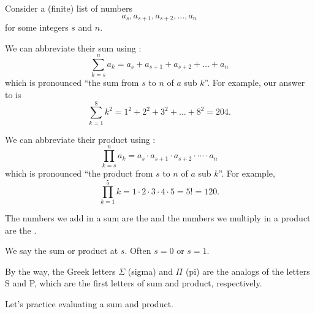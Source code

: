 \begin{defn}
\label{defn_sigma_pi}
    Consider a (finite) list of numbers  $$a_s, a_{s+1}, a_{s+2}, \ldots, a_n$$ for some integers $s$ and $n$. 
        \begin{apart}
            \item We can abbreviate their sum using : 
                $$\sum_{k=s}^n a_k =a_s + a_{s+1}+a_{s+2}+\ldots+a_n$$
            which is pronounced ``the sum from $s$ to $n$ of $a$ sub $k$''.  For example, our answer to  is 
                $$\sum_{k=1}^8 k^2 =1^2+2^2+3^2+ \ldots + 8^2 = 204.$$

            \item We can abbreviate their product using : 
                $$\prod_{k=s}^n a_k =a_s \cdot a_{s+1} \cdot a_{s+2} \cdot \cdots \cdot a_n$$
            which is pronounced ``the product from $s$ to $n$ of $a$ sub $k$''.  For example,
                $$\prod_{k=1}^5 k =1 \cdot 2 \cdot 3 \cdot 4 \cdot 5 = 5! = 120.$$

            \item The numbers we add in a sum are the  and the numbers we multiply in a product are the .
            \item We say the sum or product  at $s$.  Often $s=0$ or $s=1$.
        \end{apart}   
\end{defn}

By the way, the Greek letters $\Sigma$ (sigma) and $\Pi$ (pi) are the analogs of the letters S and P, which are the first letters of sum and product, respectively.

Let's practice evaluating a sum and product.

